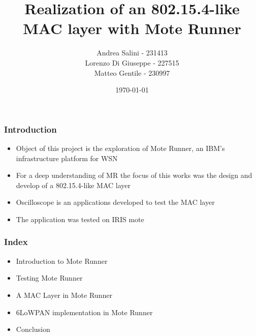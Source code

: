 \documentclass[12pt, compress]{beamer}
\title{Realization of an 802.15.4-like MAC layer with Mote Runner}
\subtitle{}
\date{\today}
\author{Andrea Salini - 231413 \\ Lorenzo Di Giuseppe - 227515 \\ Matteo Gentile - 230997}
\institute{DISIM - Università degli Studi dell’Aquila}
\begin{document}
  \maketitle
  
\begin{frame}[fragile]
  \frametitle{Introduction}
  \begin{itemize}
    \item Object of this project is the exploration of Mote Runner, an IBM’s infrastructure platform for WSN
    \item For a deep understanding of MR the focus of this works was the design and develop of a 802.15.4-like MAC layer
    \item Oscilloscope is an applications developed to test the MAC layer
    \item The application was tested on IRIS mote
  \end{itemize}
\end{frame}

\begin{frame}[fragile]
  \frametitle{Index}
  \begin{itemize}
    \item Introduction to Mote Runner
    \item Testing Mote Runner
    \item A MAC Layer in Mote Runner
    \item 6LoWPAN implementation in Mote Runner
    \item Conclusion
  \end{itemize}
\end{frame}








\end{document}

